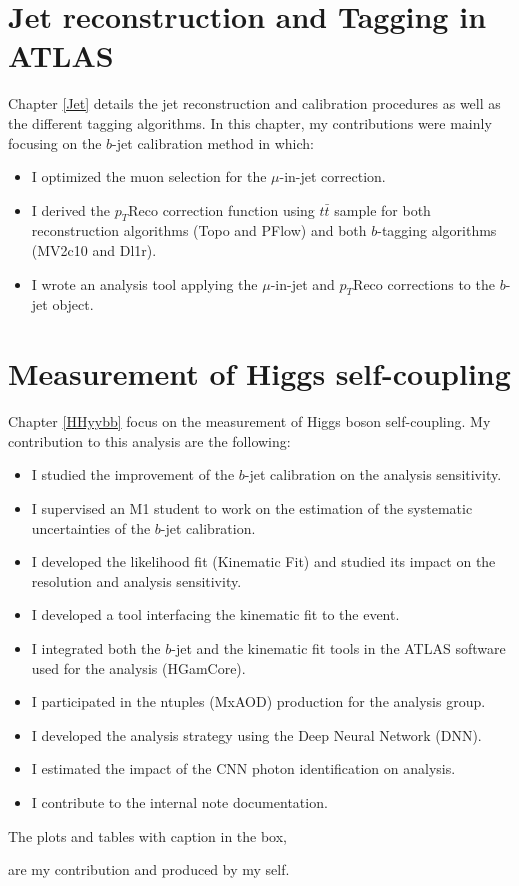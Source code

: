 \section*{Jet reconstruction and Tagging in ATLAS}
Chapter \ref{Jet} details the jet reconstruction and calibration procedures as well as the different tagging algorithms. In this chapter, my contributions were mainly focusing on the $b$-jet calibration method in which: 
\begin{itemize}
    \item I optimized the muon selection for the $\mu$-in-jet correction.
    \item I derived the $p_T$Reco correction function using $t\bar{t}$ sample for both reconstruction algorithms (Topo and PFlow) and both $b$-tagging algorithms (MV2c10 and Dl1r). 
    \item I wrote an analysis tool applying the $\mu$-in-jet and $p_T$Reco corrections to the $b$-jet object.
\end{itemize}

\section*{Measurement of Higgs self-coupling}

Chapter \ref{HHyybb} focus on the measurement of Higgs boson self-coupling. My contribution to this analysis are the following: 

\begin{itemize}
    \item I studied the improvement of the $b$-jet calibration on the analysis sensitivity.  
    \item I supervised an M1 student to work on the estimation of the systematic uncertainties of the $b$-jet calibration. 
    \item I developed the likelihood fit (Kinematic Fit) and studied its impact on the \mbb resolution and analysis sensitivity. 
    \item I developed a tool interfacing the kinematic fit to the \bbyy event.
    \item I integrated both the $b$-jet and the kinematic fit tools in the ATLAS software used for the analysis (HGamCore).
    \item I participated in the ntuples (MxAOD) production for the analysis group.
    \item I developed the analysis strategy using the Deep Neural Network (DNN).
    \item I estimated the impact of the CNN photon identification on \HHyybb analysis.
    \item I contribute to the internal note documentation.
\end{itemize}

The plots and tables with caption in the box,
\begin{tcolorbox}[colback=black!5!white,colframe=white!75!black]
\end{tcolorbox}
are my contribution and produced by my self.